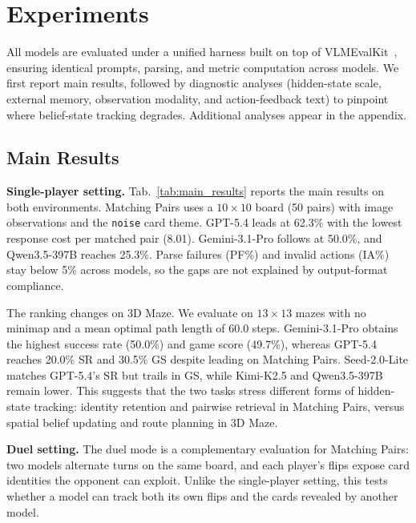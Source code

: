 \section{Experiments}
\label{sec:experiments}



All models are evaluated under a unified harness built on top of VLMEvalKit~\citep{duan2024vlmevalkit}, ensuring identical prompts, parsing, and metric computation across models. We first report main results, followed by diagnostic analyses (hidden-state scale, external memory, observation modality, and action-feedback text) to pinpoint where belief-state tracking degrades. Additional analyses appear in the appendix.

\subsection{Main Results}
\label{sec:main_results}

\noindent\textbf{Single-player setting.} Tab.~\ref{tab:main_results} reports the main results on both environments. Matching Pairs uses a $10{\times}10$ board (50 pairs) with image observations and the \texttt{noise} card theme. GPT-5.4 leads at 62.3\% with the lowest response cost per matched pair (8.01). Gemini-3.1-Pro follows at 50.0\%, and Qwen3.5-397B reaches 25.3\%. Parse failures (PF\%) and invalid actions (IA\%) stay below 5\% across models, so the gaps are not explained by output-format compliance.

The ranking changes on 3D Maze. We evaluate on $13{\times}13$ mazes with no minimap and a mean optimal path length of 60.0 steps. Gemini-3.1-Pro obtains the highest success rate (50.0\%) and game score (49.7\%), whereas GPT-5.4 reaches 20.0\% SR and 30.5\% GS despite leading on Matching Pairs. Seed-2.0-Lite matches GPT-5.4's SR but trails in GS, while Kimi-K2.5 and Qwen3.5-397B remain lower. This suggests that the two tasks stress different forms of hidden-state tracking: identity retention and pairwise retrieval in Matching Pairs, versus spatial belief updating and route planning in 3D Maze.



\noindent\textbf{Duel setting.} The duel mode is a complementary evaluation for Matching Pairs: two models alternate turns on the same board, and each player's flips expose card identities the opponent can exploit. Unlike the single-player setting, this tests whether a model can track both its own flips and the cards revealed by another model.

